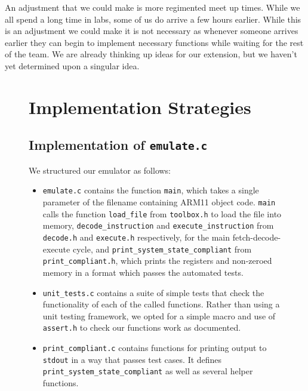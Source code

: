 \documentclass[10pt]{article}
\begin{document}
An adjustment that we could make is more regimented meet up times. While we all spend a long time in labs, some of us do arrive a few hours earlier. While this is an adjustment we could make it is not necessary as whenever someone arrives earlier they can begin to implement necessary functions while waiting for the rest of the team. We are already thinking up ideas for our extension, but we haven't yet determined upon a singular idea.

\begin{figure}[H]
\begin{minipage}{0.6\linewidth}

\section{Implementation Strategies}

\subsection{Implementation of \texttt{emulate.c}}

We structured our emulator as follows:

\begin{itemize}
\item \texttt{emulate.c} contains the function \texttt{main}, which takes a single parameter of the filename containing ARM11 object code. \texttt{main} calls the function \texttt{load\_file} from \texttt{toolbox.h} to load the file into memory, \texttt{decode\_instruction} and \texttt{execute\_instruction} from \texttt{decode.h} and \texttt{execute.h} respectively, for the main fetch-decode-execute cycle, and \texttt{print\_system\_state\_compliant} from \texttt{print\_compliant.h}, which prints the registers and non-zeroed memory in a format which passes the automated tests.
\item \texttt{unit\_tests.c} contains a suite of simple tests that check the functionality of each of the called functions. Rather than using a unit testing framework, we opted for a simple macro and use of \texttt{assert.h} to check our functions work as documented.
\item \texttt{print\_compliant.c} contains functions for printing output to \texttt{stdout} in a way that passes test cases. It defines \texttt{print\_system\_state\_compliant} as well as several helper functions.
\end{itemize}

\end{minipage}
\hspace{0.05\linewidth}
\begin{minipage}{0.35\linewidth}


\end{minipage}
\end{figure}
\end{document}
